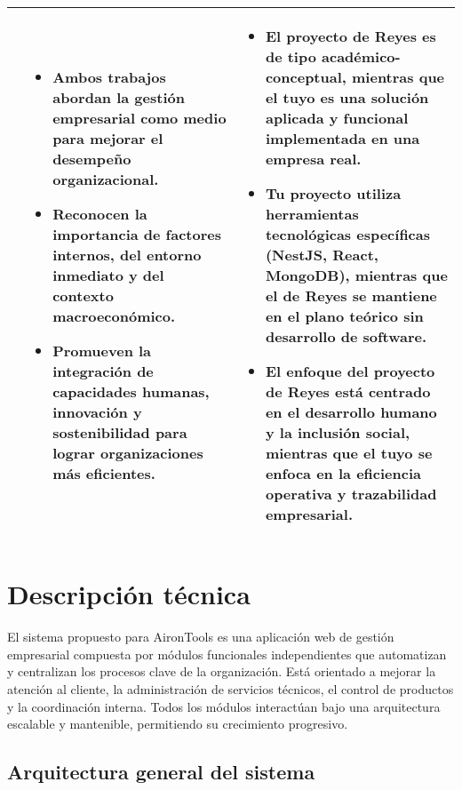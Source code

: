 \begin{longtable}{m{.05\paperwidth} *{2}{m{.33\paperwidth}} @{}}
\cite{Reyes12} &
\begin{itemize}[topsep=0pt,itemsep=0pt,parsep=0pt,partopsep=0pt,leftmargin=*]
	\item Ambos trabajos abordan la gestión empresarial como medio para mejorar el desempeño organizacional.
	\item Reconocen la importancia de factores internos, del entorno inmediato y del contexto macroeconómico.
	\item Promueven la integración de capacidades humanas, innovación y sostenibilidad para lograr organizaciones más eficientes.
\end{itemize} &
\begin{itemize}[topsep=0pt,itemsep=0pt,parsep=0pt,partopsep=0pt,leftmargin=*]
	\item El proyecto de Reyes es de tipo académico-conceptual, mientras que el tuyo es una solución aplicada y funcional implementada en una empresa real.
	\item Tu proyecto utiliza herramientas tecnológicas específicas (NestJS, React, MongoDB), mientras que el de Reyes se mantiene en el plano teórico sin desarrollo de software.
	\item El enfoque del proyecto de Reyes está centrado en el desarrollo humano y la inclusión social, mientras que el tuyo se enfoca en la eficiencia operativa y trazabilidad empresarial.
\end{itemize} \\
\bottomrule
\end{longtable}

	

\section{Descripción técnica}

El sistema propuesto para AironTools es una aplicación web de gestión empresarial compuesta por módulos funcionales independientes que automatizan y centralizan los procesos clave de la organización. Está orientado a mejorar la atención al cliente, la administración de servicios técnicos, el control de productos y la coordinación interna. Todos los módulos interactúan bajo una arquitectura escalable y mantenible, permitiendo su crecimiento progresivo.

\subsection*{Arquitectura general del sistema}

